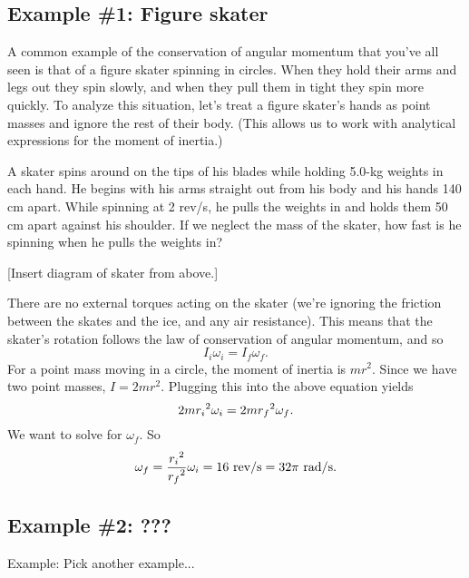 \subsection{Example \#1: Figure skater}
A common example of the conservation of angular momentum that you've all seen is that of a figure skater spinning in circles. When they hold their arms and legs out they spin slowly, and when they pull them in tight they spin more quickly. To analyze this situation, let's treat a figure skater's hands as point masses and ignore the rest of their body. (This allows us to work with analytical expressions for the moment of inertia.)

A skater spins around on the tips of his blades while holding 5.0-kg weights in each hand. He begins with his arms straight out from his body and his hands 140 cm apart. While spinning at 2 rev/s, he pulls the weights in and holds them 50 cm apart against his shoulder. If we neglect the mass of the skater, how fast is he spinning when he pulls the weights in?

[Insert diagram of skater from above.]
\vspace{5cm}

There are no external torques acting on the skater (we're ignoring the friction between the skates and the ice, and any air resistance). This means that the skater's rotation follows the law of conservation of angular momentum, and so
$$I_i\omega_i=I_f\omega_f.$$
For a point mass moving in a circle, the moment of inertia is $mr^2$. Since we have two point masses, $I=2mr^2$. Plugging this into the above equation yields
$$2mr_i\displaystyle^2\omega_i=2mr_f\displaystyle^2\omega_f.$$
We want to solve for $\omega_f$. So
$$\omega_f=\frac{r_i\displaystyle^2}{r_f\displaystyle^2}\omega_i=16\mbox{ rev/s}=32\pi\mbox{ rad/s}.$$

\subsection{Example \#2: ???}
Example: Pick another example...

